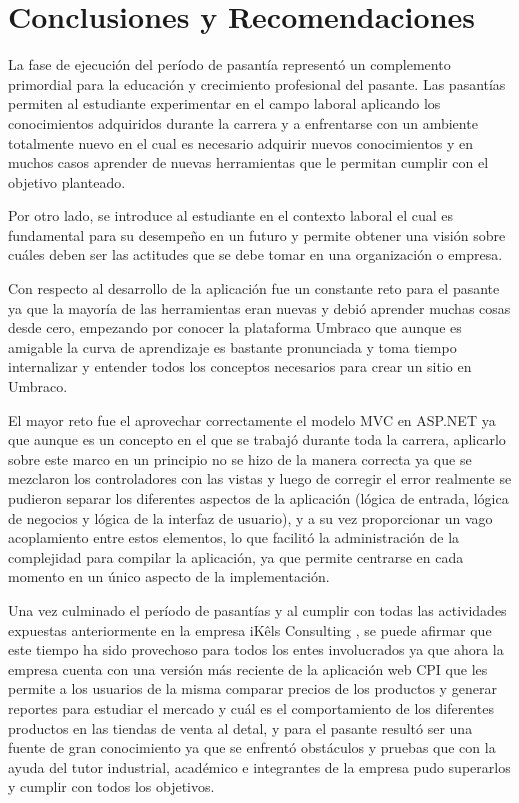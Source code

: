 \chapter*{Conclusiones y Recomendaciones}
La fase de ejecución del período de pasantía representó un complemento primordial para la educación y crecimiento profesional del pasante. Las pasantías permiten al estudiante experimentar en el campo laboral aplicando los conocimientos adquiridos durante la carrera y a enfrentarse con un ambiente totalmente nuevo en el cual es necesario adquirir nuevos conocimientos y en muchos casos aprender de nuevas herramientas que le permitan cumplir con el objetivo planteado. 

Por otro lado, se introduce al estudiante en el contexto laboral el cual es fundamental para su desempeño en un futuro y  permite obtener una visión sobre cuáles deben ser las actitudes que se debe tomar en una organización o empresa.

Con respecto al desarrollo de la aplicación fue un constante reto para el pasante ya que la mayoría de las herramientas eran nuevas y debió aprender muchas cosas desde cero, empezando por conocer la plataforma Umbraco que aunque es amigable la curva de aprendizaje es bastante pronunciada y toma tiempo internalizar y entender todos los conceptos necesarios para crear un sitio en Umbraco.

El mayor reto fue el aprovechar correctamente el modelo MVC en ASP.NET ya que aunque es un concepto en el que se trabajó durante toda la carrera, aplicarlo sobre este marco en un principio no se hizo de la manera correcta ya que se mezclaron los controladores con las vistas y luego de corregir el error realmente se pudieron separar los diferentes aspectos de la aplicación (lógica de entrada, lógica de negocios y lógica de la interfaz de usuario), y a su vez proporcionar un vago acoplamiento entre estos elementos, lo que facilitó la administración de la complejidad para compilar la aplicación, ya que permite centrarse en cada momento en un único aspecto de la implementación. 

Una vez culminado el período de pasantías y al cumplir con todas las actividades expuestas anteriormente en la empresa iKêls Consulting \cite{ikels}, se puede afirmar que este tiempo ha sido provechoso para todos los entes involucrados ya que ahora la empresa cuenta con una versión más reciente de la aplicación web CPI que les permite a los usuarios de la misma comparar precios de los productos y generar reportes para estudiar el mercado y cuál es el comportamiento de los diferentes productos en las tiendas de venta al detal, y para el pasante resultó ser una fuente de gran conocimiento ya que se enfrentó obstáculos y pruebas que con la ayuda del tutor industrial, académico e integrantes de la empresa pudo superarlos y cumplir con todos los objetivos.    


